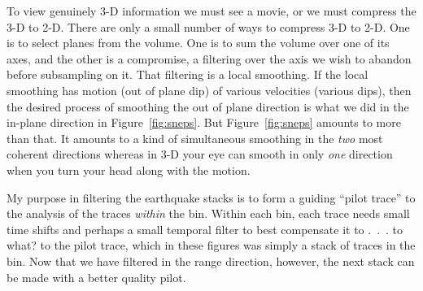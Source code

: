 \par
To view genuinely 3-D information we must see a movie,
or we must compress the 3-D to 2-D.
There are only a small number of ways to compress 3-D to 2-D.
One is to select planes from the volume.
One is to sum the volume over one of its axes,
and the other is a compromise,
a filtering over the axis we wish to abandon before subsampling on it.
That filtering is a local smoothing.
If the local smoothing has motion
(out of plane dip) of various velocities (various dips),
then the desired process of smoothing the out of plane direction
is what we did in the in-plane direction
in Figure~\ref{fig:sneps}.
But Figure~\ref{fig:sneps} amounts to more than that.
It amounts to a kind of simultaneous smoothing in the {\it two}
most coherent directions
whereas in 3-D your eye can smooth in only {\it one} direction
when you turn your head along with the motion.

\par\noindent
{}

\par

\par
My purpose in filtering the earthquake stacks
is to form a guiding ``pilot trace''
to the analysis of the traces {\it within} the bin.
Within each bin,
each trace needs small time shifts and perhaps a small temporal filter
to best compensate it to .\ .\ . to what? to the pilot trace,
which in these figures was simply a stack of traces in the bin.
Now that we have filtered in the range direction, however,
the next stack can be made with a better quality pilot.

\par

